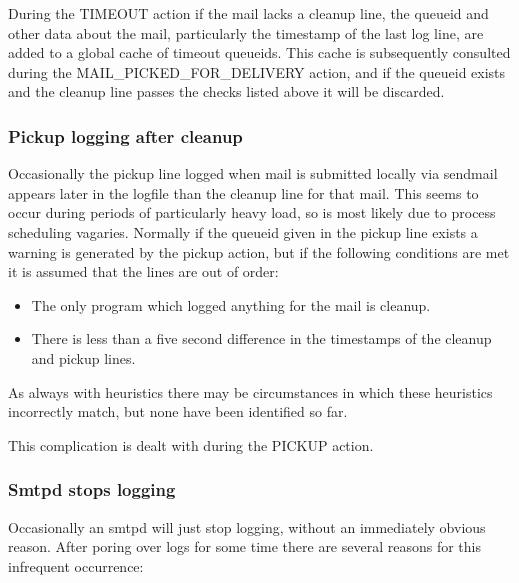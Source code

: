 \documentclass[a4paper,12pt,draft]{article}
\begin{document}
During the TIMEOUT action if the mail lacks a cleanup line, the queueid and
other data about the mail, particularly the timestamp of the last log line,
are added to a global cache of timeout queueids.  This cache is
subsequently consulted during the MAIL\_PICKED\_FOR\_DELIVERY action, and
if the queueid exists and the cleanup line passes the checks listed above
it will be discarded.

\subsubsection{Pickup logging after cleanup}

\label{pickup logging after cleanup}

Occasionally the pickup line logged when mail is submitted locally via
sendmail appears later in the logfile than the cleanup line for that mail.
This seems to occur during periods of particularly heavy load, so is most
likely due to process scheduling vagaries.  Normally if the queueid given
in the pickup line exists a warning is generated by the pickup action, but
if the following conditions are met it is assumed that the lines are out of
order:

\begin{itemize}

    \item The only program which logged anything for the mail is cleanup.

    \item There is less than a five second difference in the timestamps of
        the cleanup and pickup lines.

\end{itemize}

As always with heuristics there may be circumstances in which these
heuristics incorrectly match, but none have been identified so far.

This complication is dealt with during the PICKUP action.

\subsubsection{Smtpd stops logging}

\label{smtpd stops logging}

Occasionally an smtpd will just stop logging, without an immediately
obvious reason.  After poring over logs for some time there are several
reasons for this infrequent occurrence:
\end{document}
